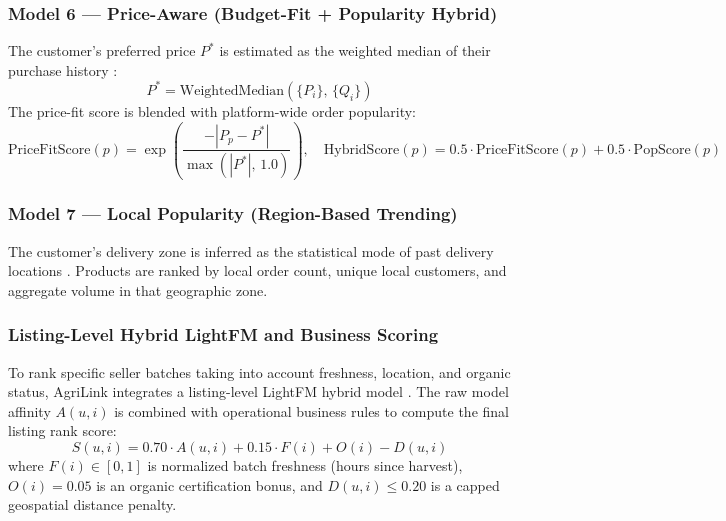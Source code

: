 \subsubsection{Model 6 --- Price-Aware (Budget-Fit + Popularity Hybrid)}
The customer's preferred price $P^*$ is estimated as the weighted median of their purchase history \cite{Ricci2015}:
\begin{equation}
P^* = \text{WeightedMedian}\!\left(\{P_i\},\, \{Q_i\}\right)
\label{eqn:wmedian}
\end{equation}
The price-fit score is blended with platform-wide order popularity:
\begin{equation}
\text{PriceFitScore}(p) = \exp\!\left(\frac{-|P_p - P^*|}{\max(|P^*|,\, 1.0)}\right), \quad \text{HybridScore}(p) = 0.5 \cdot \text{PriceFitScore}(p) + 0.5 \cdot \text{PopScore}(p)
\label{eqn:hybrid_price}
\end{equation}

\subsubsection{Model 7 --- Local Popularity (Region-Based Trending)}
The customer's delivery zone is inferred as the statistical mode of past delivery locations \cite{Ye2011}. Products are ranked by local order count, unique local customers, and aggregate volume in that geographic zone.

\subsubsection{Listing-Level Hybrid LightFM and Business Scoring}
To rank specific seller batches taking into account freshness, location, and organic status, AgriLink integrates a listing-level LightFM hybrid model \cite{Kula2015}. The raw model affinity $A(u, i)$ is combined with operational business rules to compute the final listing rank score:
\begin{equation}
S(u, i) = 0.70 \cdot A(u, i) + 0.15 \cdot F(i) + O(i) - D(u, i)
\label{eqn:lightfm_score}
\end{equation}
where $F(i) \in [0, 1]$ is normalized batch freshness (hours since harvest), $O(i) = 0.05$ is an organic certification bonus, and $D(u, i) \le 0.20$ is a capped geospatial distance penalty.

